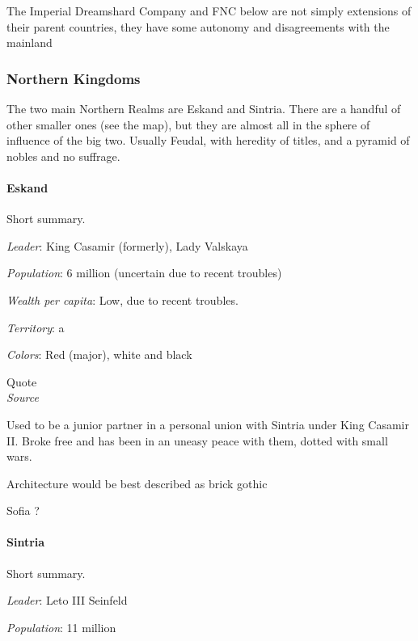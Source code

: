 The Imperial Dreamshard Company and FNC below are not simply extensions of their parent countries, they have some autonomy and disagreements with the mainland



\subsubsection{Northern Kingdoms}

The two main Northern Realms are Eskand and Sintria. There are a handful of other smaller ones (see the map), but they are almost all in the sphere of influence of the big two. Usually Feudal, with heredity of titles, and a pyramid of nobles and no suffrage.

\paragraph{Eskand}


Short summary.


\textit{Leader}: King Casamir (formerly), Lady Valskaya

\textit{Population}: 6 million (uncertain due to recent troubles)

\textit{Wealth per capita}: Low, due to recent troubles.

\textit{Territory}: a
    
\textit{Colors}: Red (major), white and black


\begin{rpg-quotebox}
Quote \\ \textendash \textit{Source}
\end{rpg-quotebox}



Used to be a junior partner in a personal union with Sintria under King Casamir II.
Broke free and has been in an uneasy peace with them, dotted with small wars.
    

Architecture would be best described as brick gothic



Sofia ?



\paragraph{Sintria}

Short summary.

\textit{Leader}: Leto III Seinfeld

\textit{Population}: 11 million

